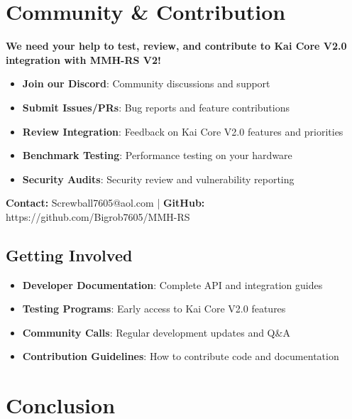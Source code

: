 \documentclass[12pt,a4paper]{article}
\makeatletter
\newcommand{\email}{Screwball7605@aol.com}
\newcommand{\github}{https://github.com/Bigrob7605/MMH-RS}
\makeatother
\begin{document}
\section{Community \& Contribution}

\begin{tcolorbox}[colback=orange!10,colframe=orange!50,title=\textbf{Help Us Build Kai Core V2.0 Integration}]
\textbf{We need your help to test, review, and contribute to Kai Core V2.0 integration with MMH-RS V2!}

\begin{itemize}
    \item \textbf{Join our Discord}: Community discussions and support
    \item \textbf{Submit Issues/PRs}: Bug reports and feature contributions
    \item \textbf{Review Integration}: Feedback on Kai Core V2.0 features and priorities
    \item \textbf{Benchmark Testing}: Performance testing on your hardware
    \item \textbf{Security Audits}: Security review and vulnerability reporting
\end{itemize}

\textbf{Contact:} \email{} | \textbf{GitHub:} \github
\end{tcolorbox}

\subsection{Getting Involved}
\begin{itemize}
    \item \textbf{Developer Documentation}: Complete API and integration guides
    \item \textbf{Testing Programs}: Early access to Kai Core V2.0 features
    \item \textbf{Community Calls}: Regular development updates and Q\&A
    \item \textbf{Contribution Guidelines}: How to contribute code and documentation
\end{itemize}

\section{Conclusion}
\end{document}
